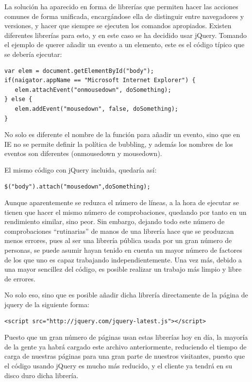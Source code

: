 La solución ha aparecido en forma de librerías que permiten hacer las acciones comunes de forma unificada, encargándose ella de distinguir entre navegadores y versiones, y hacer que siempre se ejecuten los comandos apropiados. Existen diferentes librerías para esto, y en este caso se ha decidido usar jQuery. Tomando el ejemplo de querer añadir un evento a un elemento, este es el código típico que se debería ejecutar:

\begin{verbatim}
var elem = document.getElementById("body");
if(naigator.appName == "Microsoft Internet Explorer") {
   elem.attachEvent("onmousedown", doSomething);
} else {
   elem.addEvent("mousedown", false, doSomething);
}
\end{verbatim}

No solo es diferente el nombre de la función para añadir un evento, sino que en IE no se permite definir la política de bubbling, y además los nombres de los eventos son diferentes (onmousedown y mousedown).

El mismo código con jQuery incluida, quedaría así:

\begin{verbatim}
$("body").attach("mousedown",doSomething);
\end{verbatim}

Aunque aparentemente se reduzca el número de líneas, a la hora de ejecutar se tienen que hacer el mismo número de comprobaciones, quedando por tanto en un rendimiento similar, sino peor. Sin embargo, dejando todo este número de comprobaciones ``rutinarias'' de manos de una librería hace que se produzcan menos errores, pues al ser una librería pública usada por un gran número de personas, se puede asumir hayan tenido en cuenta un mayor número de factores de los que uno es capaz trabajando independientemente. Una vez más, debido a una mayor sencillez del código, es posible realizar un trabajo más limpio y libre de errores.

No solo eso, sino que es posible añadir dicha librería directamente de la página de jquery de la siguiente forma:

\begin{verbatim}
<script src="http://jquery.com/jquery-latest.js"></script>
\end{verbatim}

Puesto que un gran número de páginas usan estas librerías hoy en día, la mayoría de la gente ya habrá cargado este archivo anteriormente, reduciendo el tiempo de carga de nuestras páginas para una gran parte de nuestros visitantes, puesto que el código usando jQuery es mucho más reducido, y el cliente ya tendrá en su disco duro dicha librería.

